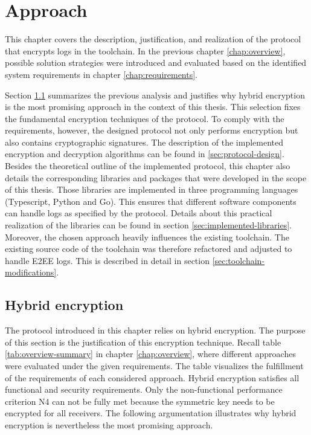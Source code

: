 \documentclass[../main.tex]{subfiles}
\begin{document}
\chapter{Approach}
\label{chap:approach}

This chapter covers the description, justification, and realization of the protocol that encrypts logs in the toolchain.
In the previous chapter \ref{chap:overview}, possible solution strategies were introduced and evaluated based on the identified system requirements in chapter \ref{chap:requirements}.

Section \ref{sec:justification} summarizes the previous analysis and justifies why hybrid encryption is the most promising approach in the context of this thesis.
This selection fixes the fundamental encryption techniques of the protocol.
To comply with the requirements, however, the designed protocol not only performs encryption but also contains cryptographic signatures.
The description of the implemented encryption and decryption algorithms can be found in \ref{sec:protocol-design}.
Besides the theoretical outline of the implemented protocol, this chapter also details the corresponding libraries and packages that were developed in the scope of this thesis.
Those libraries are implemented in three programming languages (Typescript, Python and Go).
This ensures that different software components can handle logs as specified by the protocol.
Details about this practical realization of the libraries can be found in section \ref{sec:implemented-libraries}.
Moreover, the chosen approach heavily influences the existing toolchain.
The existing source code of the toolchain was therefore refactored and adjusted to handle E2EE logs.
This is described in detail in section \ref{sec:toolchain-modifications}.

\section{Hybrid encryption}
\label{sec:justification}
The protocol introduced in this chapter relies on hybrid encryption.
The purpose of this section is the justification of this encryption technique.
Recall table \ref{tab:overview-summary} in chapter \ref{chap:overview}, where different approaches were evaluated under the given requirements.
The table visualizes the fulfillment of the requirements of each considered approach.
Hybrid encryption satisfies all functional and security requirements.
Only the non-functional performance criterion N4 can not be fully met because the symmetric key needs to be encrypted for all receivers.
The following argumentation illustrates why hybrid encryption is nevertheless the most promising approach.
\end{document}
